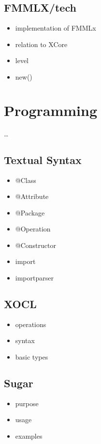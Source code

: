 \documentclass[10pt,a4paper]{report}
\begin{document}
\subsection{FMMLX/tech}
\label{sub:FMMLX/tech}
\begin{itemize}
\item implementation of FMMLx
\item relation to XCore
\item level
\item new()
\end{itemize}

\section{Programming}
\label{sec:Programming}
\ldots

\subsection{Textual Syntax}
\label{sub:Textual Syntax}
\begin{itemize}
\item @Class
\item @Attribute
\item @Package
\item @Operation
\item @Constructor
\item import
\item importparser 
\end{itemize}

\subsection{XOCL}
\label{sub:XOCL}
\begin{itemize}
\item operations
\item syntax
\item basic types
\end{itemize}

\subsection{Sugar}
\label{sub:Sugar}
\begin{itemize}
\item purpose
\item usage
\item examples
\end{itemize}
\end{document}
